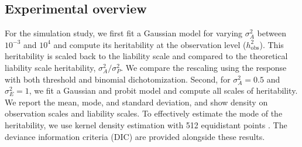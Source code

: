    




\subsection{Experimental overview}
For the simulation study, we first fit a Gaussian model for varying $\sigma^2_A$ between $10^{-3}$ and $10^4$ and compute its heritability at the observation level ($h^2_\text{obs}$). This heritability is scaled back to the liability scale and compared to the theoretical liability scale heritability, $\sigma^2_A/\sigma^2_P$. We compare the rescaling using the response with both threshold and binomial dichotomization.
Second, for $\sigma^2_A=0.5$ and $\sigma^2_E=1$, we fit a Gaussian and probit model and compute all scales of heritability. We report the mean, mode, and standard deviation, and show density on observation scales and liability scales. To effectively estimate the mode of the heritability, we use kernel density estimation with 512 equidistant points \autocite{r-core-team}. The deviance information criteria (DIC) are provided alongside these results.


